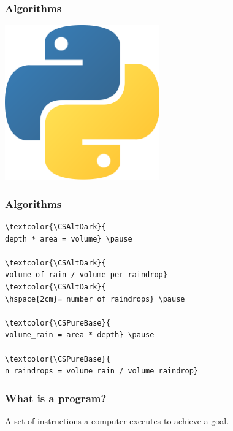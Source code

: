\documentclass[11pt]{beamer}
\begin{document}
\begin{frame}[fragile]
  \frametitle{Algorithms}

  \begin{centering}
  \includegraphics[width=0.5\textwidth]{./img/python-logo.png}
  \end{centering}
\end{frame}

\begin{frame}[fragile]
  \frametitle{Algorithms}
  \Enlarge
  \begin{Verbatim}[commandchars=\\\{\}]
\textcolor{\CSAltDark}{
depth * area = volume} \pause

\textcolor{\CSAltDark}{
volume of rain / volume per raindrop}
\textcolor{\CSAltDark}{
\hspace{2cm}= number of raindrops} \pause

\textcolor{\CSPureBase}{
volume_rain = area * depth} \pause

\textcolor{\CSPureBase}{
n_raindrops = volume_rain / volume_raindrop}
  \end{Verbatim}
\end{frame}

\begin{frame}
  \frametitle{What is a program?}
  \Enlarge

  \begin{itemize} \pause
    \myitem A set of instructions a computer executes to achieve a goal.
  \end{itemize}
\end{frame}
\end{document}
